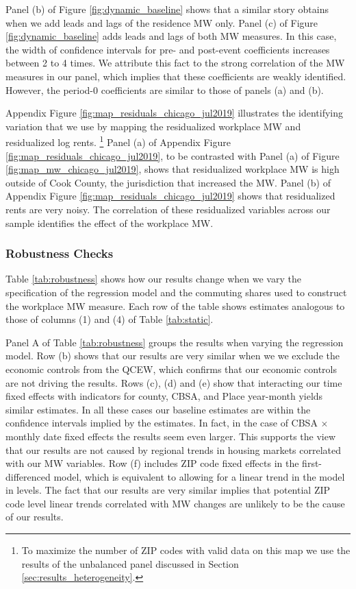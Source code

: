 Panel (b) of Figure \ref{fig:dynamic_baseline} shows that a similar story 
obtains when we add leads and lags of the residence MW only.
Panel (c) of Figure \ref{fig:dynamic_baseline} adds leads and lags of both MW 
measures.
In this case, the width of confidence intervals for pre- and post-event 
coefficients increases between 2 to 4 times.
We attribute this fact to the strong correlation of the MW measures in our
panel, which implies that these coefficients are weakly identified.
However, the period-0 coefficients are similar to those of panels (a) and (b).

Appendix Figure \ref{fig:map_residuals_chicago_jul2019} illustrates the 
identifying variation that we use by mapping the residualized workplace MW and 
residualized log rents.%
\footnote{To maximize the number of ZIP codes with valid data on this map we
use the results of the unbalanced panel discussed in Section 
\ref{sec:results_heterogeneity}.}
Panel (a) of Appendix Figure \ref{fig:map_residuals_chicago_jul2019}, to be 
contrasted with Panel (a) of Figure \ref{fig:map_mw_chicago_jul2019}, 
shows that residualized workplace MW is high outside of Cook County, the 
jurisdiction that increased the MW.
Panel (b) of Appendix Figure \ref{fig:map_residuals_chicago_jul2019} shows 
that residualized rents are very noisy.
The correlation of these residualized variables across our sample identifies
the effect of the workplace MW.

\subsubsection*{Robustness Checks}

Table \ref{tab:robustness} shows how our results change when we vary the
specification of the regression model and the commuting shares used 
to construct the workplace MW measure.
Each row of the table shows estimates analogous to those of columns (1) and (4)
of Table \ref{tab:static}.

Panel A of Table \ref{tab:robustness} groups the results when varying the 
regression model.
Row (b) shows that our results are very similar when we we exclude the 
economic controls from the QCEW, which confirms that our economic controls are 
not driving the results.
Rows (c), (d) and (e) show that interacting our time fixed effects with 
indicators for county, CBSA, and Place year-month yields similar estimates.
In all these cases our baseline estimates are within the confidence intervals
implied by the estimates.
In fact, in the case of CBSA $\times$ monthly date fixed effects the
results seem even larger.
This supports the view that our results are not caused by regional trends 
in housing markets correlated with our MW variables.
Row (f) includes ZIP code fixed effects in the first-differenced model, which
is equivalent to allowing for a linear trend in the model in levels.
The fact that our results are very similar implies that potential ZIP code 
level linear trends correlated with MW changes are unlikely to be the cause
of our results.

